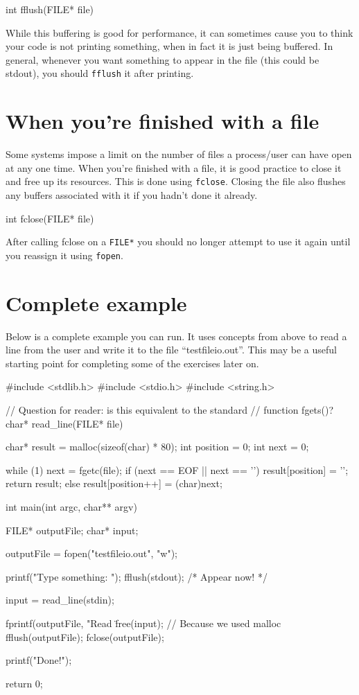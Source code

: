 \begin{codeinline}
int fflush(FILE* file)
\end{codeinline}

While this buffering is good for performance, it can sometimes cause you to think your code is not printing something, when in fact it is just being buffered.
In general, whenever you want something to appear in the file (this could be stdout), you should \texttt{fflush} it after printing.

\section{When you're finished with a file}

Some systems impose a limit on the number of files a process/user can have open at any one time.
When you're finished with a file, it is good practice to close it and free up its resources.
This is done using \texttt{fclose}.
Closing the file also flushes any buffers associated with it if you hadn't done it already.

\begin{codeinline}
int fclose(FILE* file)
\end{codeinline}

After calling fclose on a \texttt{FILE*} you should no longer attempt to use it again until you reassign it using \texttt{fopen}.

\section{Complete example}

Below is a complete example you can run. 
It uses concepts from above to read a line from the user and write it to the file ``testfileio.out''.
This may be a useful starting point for completing some of the exercises later on.

\begin{codeblock}
#include <stdlib.h>
#include <stdio.h>
#include <string.h>

// Question for reader: is this equivalent to the standard
// function fgets()?
char* read_line(FILE* file)
{
    char* result = malloc(sizeof(char) * 80);
    int position = 0;
    int next = 0;

    while (1) {
        next = fgetc(file);
        if (next == EOF || next == '\n') {
            result[position] = '\0';
            return result;
        } else {
            result[position++] = (char)next;
        }
    }
}

int main(int argc, char** argv)
{
    FILE* outputFile;
    char* input;

    outputFile = fopen("testfileio.out", "w");

    printf("Type something: ");
    fflush(stdout); /* Appear now! */

    input = read_line(stdin);

    fprintf(outputFile, "Read \"%
    free(input); // Because we used malloc
    fflush(outputFile);
    fclose(outputFile);

    printf("Done!\n");

    return 0;
}
\end{codeblock}
